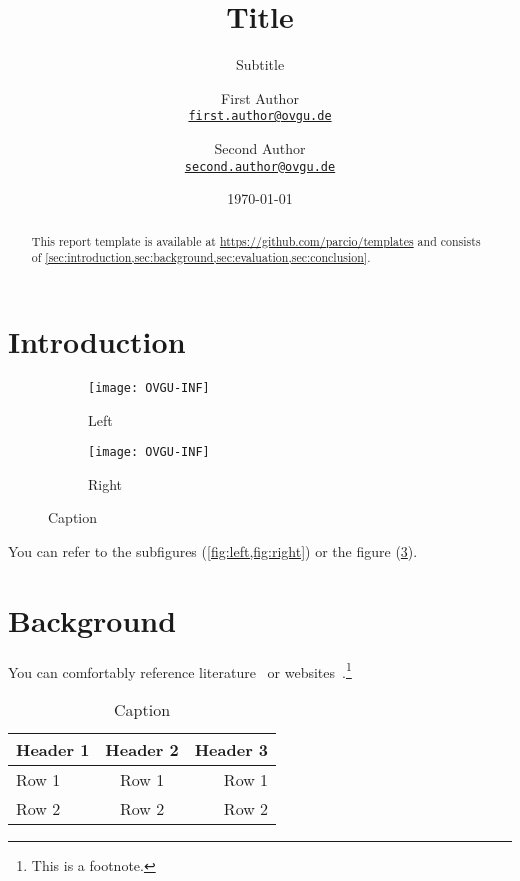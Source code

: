 \documentclass[
	12pt,
	a4paper,
	bibliography=totoc,
	numbers=endperiod,
	parskip=half,
]{scrartcl}
\title{Title}
\subtitle{Subtitle}
\author{
First Author\\
{\large\href{mailto:first.author@ovgu.de}{\nolinkurl{first.author@ovgu.de}}}
\and
Second Author\\
{\large\href{mailto:second.author@ovgu.de}{\nolinkurl{second.author@ovgu.de}}}
}
\date{\today}
\begin{document}
\maketitle

\begin{abstract}
\lipsum[1]

This report template is available at \url{https://github.com/parcio/templates} and consists of \cref{sec:introduction,sec:background,sec:evaluation,sec:conclusion}.
\end{abstract}

\newpage

\tableofcontents

\newpage

\section{Introduction}
\label{sec:introduction}

\begin{figure}[ht]
	\centering
	\begin{subfigure}{0.45\textwidth}
		\centering
		\texttt{[image: OVGU-INF]}
		\caption{Left}
		\label{fig:left}
	\end{subfigure}
	\begin{subfigure}{0.45\textwidth}
		\centering
		\texttt{[image: OVGU-INF]}
		\caption{Right}
		\label{fig:right}
	\end{subfigure}
	\caption{Caption}
	\label{fig:both}
\end{figure}

You can refer to the subfigures (\cref{fig:left,fig:right}) or the figure (\cref{fig:both}).

\section{Background}
\label{sec:background}

You can comfortably reference literature~\cite{DBLP:journals/superfri/DuweLMSF0B020} or websites~\cite{WWW:ParCIO-Blog}.\footnote{This is a footnote.}

\begin{table}[ht]
	\centering
	\begin{tabular}{|l|c|r|}
		\hline
		\textbf{Header 1} & \textbf{Header 2} & \textbf{Header 3} \\
		\hline
		\hline
		Row 1 & Row 1 & Row 1 \\
		Row 2 & Row 2 & Row 2 \\
		\hline
	\end{tabular}
	\caption{Caption}
	\label{tab:table}
\end{table}
\end{document}
